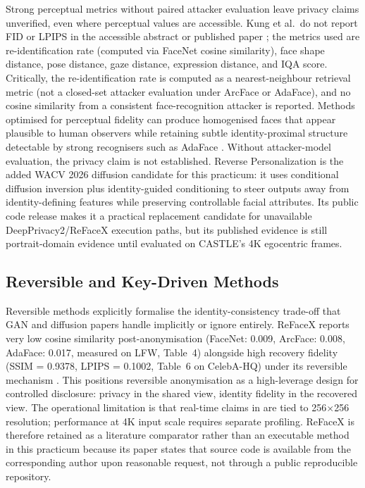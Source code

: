 \documentclass[12pt, onecolumn]{IEEEtran}
\begin{document}
Strong perceptual metrics without paired attacker evaluation leave
privacy claims unverified, even where perceptual values are accessible.
Kung et al.\ do not report FID or LPIPS in the accessible abstract or
published paper \cite{kung2025face}; the metrics used are re-identification
rate (computed via FaceNet cosine similarity), face shape distance, pose distance, gaze distance, expression
distance, and IQA score. Critically, the re-identification rate is computed
as a nearest-neighbour retrieval metric (not a closed-set attacker evaluation under ArcFace or AdaFace),
and no cosine similarity from a consistent face-recognition attacker
is reported. Methods optimised for perceptual fidelity can produce
homogenised faces that appear plausible to human observers while
retaining subtle identity-proximal structure detectable by strong
recognisers such as AdaFace \cite{kim2022adaface}. Without
attacker-model evaluation, the privacy claim is not established.
Reverse Personalization \cite{kung2026reverse} is the added WACV 2026
diffusion candidate for this practicum: it uses conditional diffusion
inversion plus identity-guided conditioning to steer outputs away from
identity-defining features while preserving controllable facial
attributes. Its public code release makes it a practical replacement
candidate for unavailable DeepPrivacy2/ReFaceX execution paths, but its
published evidence is still portrait-domain evidence until evaluated on
CASTLE's 4K egocentric frames.

\subsection{Reversible and Key-Driven Methods}

Reversible methods explicitly formalise the identity-consistency
trade-off that GAN and diffusion papers handle implicitly or ignore
entirely. ReFaceX reports very low cosine similarity
post-anonymisation (FaceNet: 0.009, ArcFace: 0.008, AdaFace: 0.017,
measured on LFW, Table~4) alongside high recovery fidelity
(SSIM = 0.9378, LPIPS = 0.1002, Table~6 on CelebA-HQ) under its
reversible mechanism \cite{muhammad2026refacex}. This positions
reversible anonymisation as a high-leverage design for controlled
disclosure: privacy in the shared view, identity fidelity in the
recovered view. The operational limitation is that real-time claims in
\cite{muhammad2026refacex} are tied to 256$\times$256 resolution;
performance at 4K input scale requires separate profiling. ReFaceX is
therefore retained as a literature comparator rather than an executable
method in this practicum because its paper states that source code is
available from the corresponding author upon reasonable request, not
through a public reproducible repository.
\end{document}
